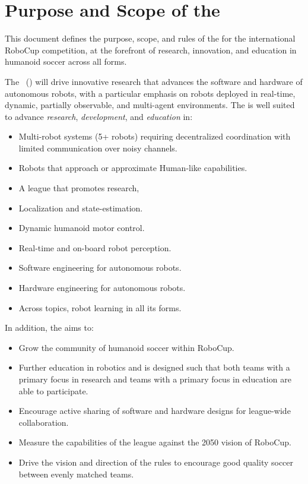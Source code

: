 \section{Purpose and Scope of the \leaguename}
\label{sec:introduction}

This document defines the purpose, scope, and rules of the \leaguename for the international RoboCup competition, at the forefront of research, innovation, and education in humanoid soccer across all forms.

\label{sec:vision_and_mission}

The \leaguename~(\leaguenameabbr) will drive innovative research that advances the software and hardware of autonomous robots, with a particular emphasis on robots deployed in real-time, dynamic, partially observable, and multi-agent environments.
The \leaguenameabbr is well suited to advance \textit{research}, \textit{development}, and \textit{education} in:
\begin{itemize}
    \item Multi-robot systems (5+ robots) requiring decentralized coordination with limited communication over noisy channels.
    \item Robots that approach or approximate Human-like capabilities.
    \item A league that promotes research, 
    \item Localization and state-estimation.
    \item Dynamic humanoid motor control.
    \item Real-time and on-board robot perception.
    \item Software engineering for autonomous robots.
    \item Hardware engineering for autonomous robots.
    \item Across topics, robot learning in all its forms.
\end{itemize}

In addition, the \leaguenameabbr aims to:
\begin{itemize}
    \item Grow the community of humanoid soccer within RoboCup.
    \item Further education in robotics and is designed such that both teams with a primary focus in research and teams with a primary focus in education are able to participate.
    \item Encourage active sharing of software and hardware designs for league-wide collaboration.
    \item Measure the capabilities of the league against the 2050 vision of RoboCup.
    \item Drive the vision and direction of the rules to encourage good quality soccer between evenly matched teams.
\end{itemize}


